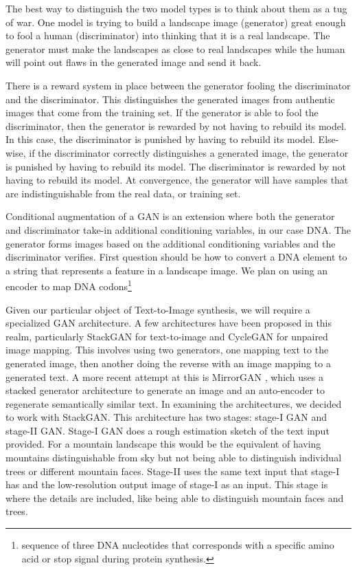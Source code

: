 \documentclass{article}
\begin{document}
	The best way to distinguish the two model types is to think about them as a tug of war. One model is trying to build a landscape image (generator) great enough to fool a human (discriminator) into thinking that it is a real landscape. The generator must make the landscapes as close to real landscapes while the human will point out flaws in the generated image and send it back.  
	
	There is a reward system in place between the generator fooling the discriminator and the discriminator.  This distinguishes the generated images from authentic images that come from the training set. If the generator is able to fool the discriminator, then the generator is rewarded by not having to rebuild its model.  In this case, the discriminator is punished by having to rebuild its model. Else-wise, if the discriminator correctly distinguishes a generated image, the generator is punished by having to rebuild its model.  The discriminator is rewarded by not having to rebuild its model. At convergence, the generator will have samples that are indistinguishable from the real data, or training set.  
	
	Conditional augmentation of a GAN is an extension where both the generator and discriminator take-in additional conditioning variables, in our case DNA.  The generator forms images based on the additional conditioning variables and the discriminator verifies. First question should be how to convert a DNA element to a string that represents a feature in a landscape image. We plan on using an encoder to map DNA codons\footnote{sequence of three DNA nucleotides that corresponds with a specific amino acid or stop signal during protein synthesis.}  
	
	Given our particular object of Text-to-Image synthesis, we will require a specialized GAN architecture. A few architectures have been proposed in this realm, particularly StackGAN \cite{zhang2017stackgan} for text-to-image and CycleGAN \cite{CycleGAN2017} for unpaired image mapping. This involves using two generators, one mapping text to the generated image, then another doing the reverse with an image mapping to a generated text. A more recent attempt at this is MirrorGAN \cite{qiao2019mirrorgan}, which uses a stacked generator architecture to generate an image and an auto-encoder to regenerate semantically similar text. In examining the architectures, we decided to work with StackGAN. This architecture has two stages: stage-I GAN and stage-II GAN. Stage-I GAN does a rough estimation sketch of the text input provided. For a mountain landscape this would be the equivalent of having mountains distinguishable from sky but not being able to distinguish individual trees or different mountain faces. Stage-II uses the same text input that stage-I has and the low-resolution output image of stage-I as an input. This stage is where the details are included, like being able to distinguish mountain faces and trees.  
	
\end{document}
